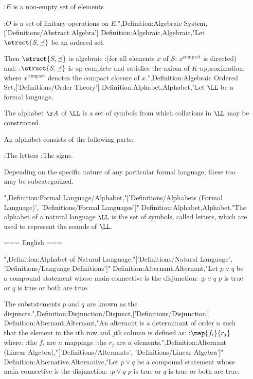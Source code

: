 :$E$ is a non-empty set of elements

:$O$ is a set of finitary operations on $E$.",Definition:Algebraic System,['Definitions/Abstract Algebra']
Definition:Algebraic,Algebraic,"Let $\struct {S, \preceq}$ be an ordered set.


Then $\struct {S, \preceq}$ is algebraic 
:(for all elements $x$ of $S$: $x^{\mathrm{compact} }$ is directed)
and:
:$\struct {S, \preceq}$ is up-complete and satisfies the axiom of $K$-approximation:
where $x^{\mathrm{compact} }$ denotes the compact closure of $x$.",Definition:Algebraic Ordered Set,['Definitions/Order Theory']
Definition:Alphabet,Alphabet,"Let $\LL$ be a formal language.


The alphabet $\AA$ of $\LL$ is a set of symbols from which collations in $\LL$ may be constructed.

An alphabet consists of the following parts:

:The letters
:The signs.

Depending on the specific nature of any particular formal language, these too may be subcategorized.







",Definition:Formal Language/Alphabet,"['Definitions/Alphabets (Formal Language)', 'Definitions/Formal Languages']"
Definition:Alphabet,Alphabet,"The alphabet of a natural language $\LL$ is the set of symbols, called letters, which are used to represent the sounds of $\LL$.


=== English ===

",Definition:Alphabet of Natural Language,"['Definitions/Natural Language', 'Definitions/Language Definitions']"
Definition:Alternant,Alternant,"Let $p \lor q$ be a compound statement whose main connective is the disjunction:
:$p \lor q$  $p$ is true or $q$ is true or both are true.


The substatements $p$ and $q$ are known as the disjuncts.",Definition:Disjunction/Disjunct,['Definitions/Disjunction']
Definition:Alternant,Alternant,"An alternant is a determinant of order $n$ such that the element in the $i$th row and $j$th column is defined as:
:$\map {f_i} {r_j}$
where:
:the $f_i$ are $n$ mappings
:the $r_j$ are $n$ elements.",Definition:Alternant (Linear Algebra),"['Definitions/Alternants', 'Definitions/Linear Algebra']"
Definition:Alternative,Alternative,"Let $p \lor q$ be a compound statement whose main connective is the disjunction:
:$p \lor q$  $p$ is true or $q$ is true or both are true.



